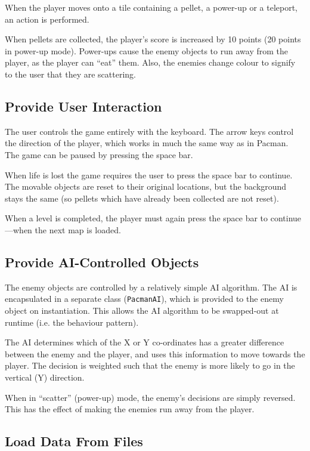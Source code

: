 \documentclass[a4paper,11pt]{article}
\begin{document}
    When the player moves onto a tile containing a pellet, a power-up or
    a teleport, an action is performed.

    When pellets are collected, the player's score is increased by 10 points
    (20 points in power-up mode). Power-ups cause the enemy objects to run away
    from the player, as the player can ``eat'' them. Also, the enemies change
    colour to signify to the user that they are scattering.

    \subsection{Provide User Interaction}

    The user controls the game entirely with the keyboard. The arrow keys
    control the direction of the player, which works in much the same way as
    in Pacman. The game can be paused by pressing the space bar.

    When life is lost the game requires the user to press the space bar to
    continue. The movable objects are reset to their original locations, but
    the background stays the same (so pellets which have already been collected
    are not reset).

    When a level is completed, the player must again press the space bar to
    continue---when the next map is loaded.

    \subsection{Provide AI-Controlled Objects}

    The enemy objects are controlled by a relatively simple AI algorithm. The
    AI is encapsulated in a separate class (\verb!PacmanAI!), which is provided
    to the enemy object on instantiation. This allows the AI algorithm to be
    swapped-out at runtime (i.e. the behaviour pattern).

    The AI determines which of the X or Y co-ordinates has a greater difference
    between the enemy and the player, and uses this information to move towards
    the player. The decision is weighted such that the enemy is more likely to
    go in the vertical (Y) direction.

    When in ``scatter'' (power-up) mode, the enemy's decisions are simply
    reversed. This has the effect of making the enemies run away from the
    player.

    \subsection{Load Data From Files}
\end{document}
